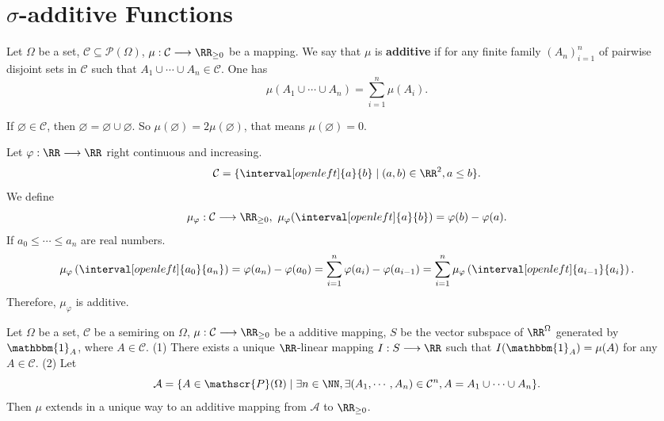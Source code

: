 \section{$\sigma$-additive Functions}
\begin{definitionenv}
    Let $\Omega$ be a set, $\mathcal{C}\subseteq \mathscr{P}(\Omega)$, $\mu:\mathcal{C}\longrightarrow \RR_{\ge 0}$ be a mapping. We say that $\mu$ is \textbf{additive} if for any finite family $(A_n)^{n}_{i=1}$ of pairwise disjoint sets in $\mathcal{C}$ such that $A_1\cup\cdots\cup A_n\in \mathcal{C}$. One has
    $$\mu(A_1\cup\cdots\cup A_n)=\sum_{i=1}^{n}\mu(A_i).$$
\end{definitionenv}
\begin{remark}
    If $\varnothing \in \mathcal{C}$, then $\varnothing=\varnothing\cup\varnothing$. So $\mu(\varnothing)=2\mu(\varnothing)$, that means $\mu(\varnothing)=0$.
\end{remark}
\begin{exampleenv}
    Let $\varphi:\RR\longrightarrow \RR$ right continuous and increasing.
    $$ \mathcal{C}=\{\interval[open left]{a}{b}\mid (a,b)\in \RR^2,a\le b\}.$$
    We define 
    $$\mu_{\varphi}:\mathcal{C}\longrightarrow \RR_{\ge 0},\ \mu_{\varphi}(\interval[open left]{a}{b})=\varphi(b)-\varphi(a).$$
    If $a_0\le \cdots\le a_n$ are real numbers.
    $$ \mu_\varphi\left(\interval[open left]{a_0}{a_n}\right)=\varphi(a_n)-\varphi(a_0)=\sum_{i=1}^{n}\varphi(a_i)-\varphi(a_{i-1})=\sum_{i=1}^{n}\mu_{\varphi}\left(\interval[open left]{a_{i-1}}{a_i}\right).$$
    Therefore, $\mu_\varphi$ is additive.
\end{exampleenv}
\begin{propositionenv}
    Let $\Omega$ be a set, $\mathcal{C}$ be a semiring on $\Omega$, $\mu:\mathcal{C}\longrightarrow \RR_{\ge 0}$ be a additive mapping, $S$ be the vector subspace of $\RR^\Omega$ generated by $\mathbbm{1}_A$, where $A\in \mathcal{C}$.
    \newline
    (1) There exists a unique $\RR$-linear mapping $I:S\longrightarrow \RR$ such that $I(\mathbbm{1}_A)=\mu(A)$ for any $A\in \mathcal{C}$.
    \newline
    (2) Let 
    $$ \mathcal{A}=\{A\in \mathscr{P}(\Omega)\mid \exists n\in \NN, \exists (A_1,\cdots,A_n)\in \mathcal{C}^n, A=A_1\cup\cdots\cup A_n\}.$$
    Then $\mu$ extends in a unique way to an additive mapping from $\mathcal{A}$ to $\RR_{\ge 0}$.
\end{propositionenv}
